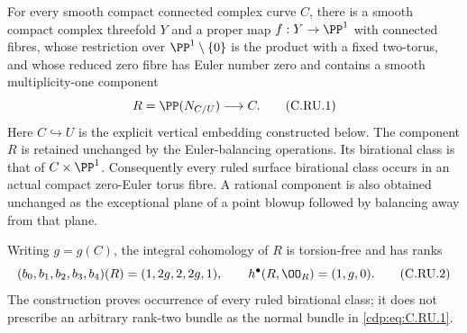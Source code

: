 \begin{proposition}\label{cdp:st:C.2.UN.45}

For every smooth compact connected complex curve $C$, there is a smooth
compact complex threefold $Y$ and a proper map $f:Y\to\PP^1$ with connected
fibres, whose restriction over $\PP^1\setminus\{0\}$ is the product with a
fixed two-torus, and whose reduced zero fibre has Euler number zero and
contains a smooth multiplicity-one component
\[
                         R=\PP(N_{C/U})\longrightarrow C.
\tag{C.RU.1}\label{cdp:eq:C.RU.1}
\]
Here $C\hookrightarrow U$ is the explicit vertical embedding constructed
below. The component $R$ is retained unchanged by the Euler-balancing
operations. Its birational class is that of $C\times\PP^1$.
Consequently every ruled surface birational class occurs in an actual
compact zero-Euler torus fibre. A rational component is also obtained
unchanged as the exceptional plane of a point blowup followed by balancing
away from that plane.

Writing $g=g(C)$, the integral cohomology of $R$ is torsion-free and has ranks
\[
              (b_0,b_1,b_2,b_3,b_4)(R)=(1,2g,2,2g,1),
              \qquad h^\bullet(R,\OO_R)=(1,g,0).
\tag{C.RU.2}\label{cdp:eq:C.RU.2}
\]
The construction proves occurrence of every ruled birational class; it
does not prescribe an arbitrary rank-two bundle as the normal bundle in
\eqref{cdp:eq:C.RU.1}.
\end{proposition}

